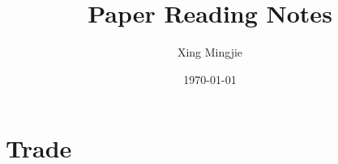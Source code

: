 \usepackage{sectsty}
\allsectionsfont{\rmfamily\bfseries\upshape} %

\usepackage[nottoc,notlof,notlot]{tocbibind} %
\usepackage[titles,subfigure]{tocloft} %
\renewcommand{\cftsecfont}{\rmfamily\mdseries\upshape}
\renewcommand{\cftsecpagefont}{\rmfamily\mdseries\upshape} %

\usepackage[colorlinks,citecolor=black,urlcolor=black,bookmarks=false,hypertexnames=true]{hyperref} 




\title{Paper Reading Notes}
\author{Xing Mingjie}
\date{\today} %


\maketitle

\tableofcontents

\newpage

\section{Trade}
	\subsection{\cite{Fernandesetal2023}}


\newpage
